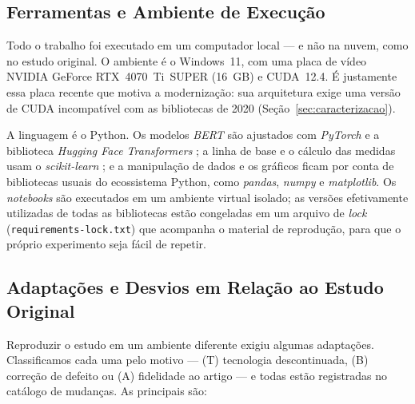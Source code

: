 \documentclass[sigconf, nonacm]{acmart}
\begin{document}
\subsection{Ferramentas e Ambiente de Execução}
\label{sec:ambiente}
 
Todo o trabalho foi executado em um computador local --- e não na nuvem,
como no estudo original. O ambiente é o Windows~11, com uma placa de vídeo
NVIDIA GeForce RTX~4070~Ti~SUPER (16~GB) e CUDA~12.4. É justamente essa
placa recente que motiva a modernização: sua arquitetura exige uma versão
de CUDA incompatível com as bibliotecas de 2020 (Seção~\ref{sec:caracterizacao}).
 
A linguagem é o Python. Os modelos \emph{BERT} são ajustados com
\emph{PyTorch} \cite{paszke2019pytorch} e a biblioteca \emph{Hugging Face
Transformers} \cite{wolf2020transformers}; a linha de base e o cálculo das
medidas usam o \emph{scikit-learn} \cite{pedregosa2011scikit}; e a
manipulação de dados e os gráficos ficam por conta de bibliotecas usuais do
ecossistema Python, como \emph{pandas}, \emph{numpy} e \emph{matplotlib}.
Os \emph{notebooks} são executados em um ambiente virtual isolado; as
versões efetivamente utilizadas de todas as bibliotecas estão congeladas
em um arquivo de \emph{lock} (\texttt{requirements\allowbreak-lock.txt})
que acompanha o material de reprodução, para que o próprio experimento
seja fácil de repetir.
 
\subsection{Adaptações e Desvios em Relação ao Estudo Original}
\label{sec:desvios}
 
Reproduzir o estudo em um ambiente diferente exigiu algumas adaptações.
Classificamos cada uma pelo motivo --- (T) tecnologia
descontinuada, (B) correção de defeito ou (A) fidelidade
ao artigo --- e todas estão registradas no catálogo de mudanças. As
principais são:
 
\end{document}

